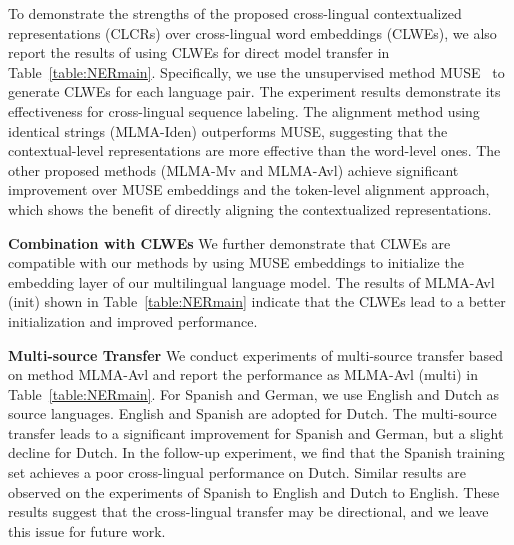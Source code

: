 \documentclass[11pt,a4paper]{article}
\begin{document}
	To demonstrate the strengths of the proposed cross-lingual contextualized representations (CLCRs) over cross-lingual word embeddings (CLWEs), we also report the results of using CLWEs for direct model transfer in Table~\ref{table:NERmain}.  Specifically, we use the unsupervised method MUSE~\cite{conneau2017word} to generate CLWEs for each language pair. The experiment results demonstrate its effectiveness for cross-lingual sequence labeling. The alignment method using identical strings (MLMA-Iden) outperforms MUSE, suggesting that the contextual-level representations are more effective than the word-level ones. The other proposed methods (MLMA-Mv and MLMA-Avl) achieve significant improvement over MUSE embeddings and the token-level alignment approach, which shows the benefit of directly aligning the contextualized representations.
	
	\noindent\textbf{Combination with CLWEs} We further demonstrate that CLWEs are compatible with our methods by using MUSE embeddings to initialize the embedding layer of our multilingual language model. The results of MLMA-Avl (init) shown in Table~\ref{table:NERmain} indicate that the CLWEs lead to a better initialization and improved performance.
	
	\noindent\textbf{Multi-source Transfer} We conduct experiments of multi-source transfer based on method MLMA-Avl and report the performance as MLMA-Avl (multi) in Table~\ref{table:NERmain}. For Spanish and German, we use English and Dutch as source languages. English and Spanish are adopted for Dutch. The multi-source transfer leads to a significant improvement for Spanish and German, but a slight decline for Dutch. In the follow-up experiment, we find that the Spanish training set achieves a poor cross-lingual performance on Dutch. Similar results are observed on the experiments of Spanish to English and Dutch to English. These results suggest that the cross-lingual transfer may be directional, and we leave this issue for future work.
	
	
\end{document}

